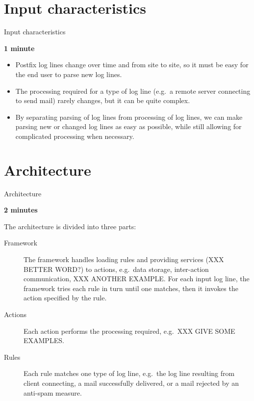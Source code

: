 \documentclass{beamer}
\newcommand{\timingnote}[1]{%
    \textbf{#1}%
}
\begin{document}
\section{Input characteristics}

\begin{frame}{Input characteristics}

    \timingnote{1 minute}

    \begin{itemize}

        \item Postfix log lines change over time and from site to site, so
            it must be easy for the end user to parse new log lines.

        \item The processing required for a type of log line (e.g.\ a
            remote server connecting to send mail) rarely changes, but it
            can be quite complex.

        \item By separating parsing of log lines from processing of log
            lines, we can make parsing new or changed log lines as easy as
            possible, while still allowing for complicated processing when
            necessary.

    \end{itemize}

\end{frame}


\section{Architecture}

\begin{frame}{Architecture}

    \timingnote{2 minutes}

    The architecture is divided into three parts:

    \begin{description}

        \item [Framework] The framework handles loading rules and providing
            services (XXX BETTER WORD\@?) to actions, e.g.\ data storage,
            inter-action communication, XXX ANOTHER EXAMPLE\@.  For each
            input log line, the framework tries each rule in turn until one
            matches, then it invokes the action specified by the rule.

        \item [Actions] Each action performs the processing required, e.g.\
            XXX GIVE SOME EXAMPLES\@.

        \item [Rules] Each rule matches one type of log line, e.g.\ the log
            line resulting from client connecting, a mail successfully
            delivered, or a mail rejected by an anti-spam measure.

    \end{description}

\end{frame}
\end{document}
